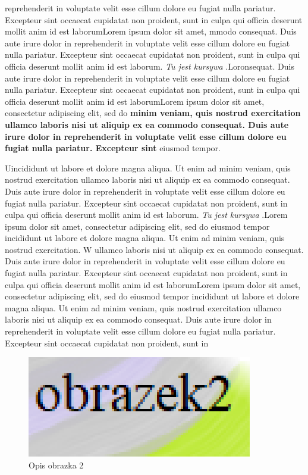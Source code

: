 \documentclass[12pt,a4paper,titlepage]{article}
\begin{document}
reprehenderit in voluptate velit esse cillum dolore eu fugiat nulla pariatur. Excepteur sint occaecat cupidatat non proident, sunt in culpa qui officia deserunt mollit anim id est laborumLorem ipsum dolor sit amet, mmodo consequat. Duis aute irure dolor in reprehenderit in voluptate velit esse cillum dolore eu fugiat nulla pariatur. Excepteur sint occaecat cupidatat non proident, sunt in culpa qui officia deserunt mollit anim id est laborum.  \textit{Tu jest kursywa} .Loronsequat. Duis aute irure dolor in reprehenderit in voluptate velit esse cillum dolore eu fugiat nulla pariatur. Excepteur sint occaecat cupidatat non proident, sunt in culpa qui officia deserunt mollit anim id est laborumLorem ipsum dolor sit amet, consectetur adipiscing elit, sed do \textbf{minim veniam, quis nostrud exercitation ullamco laboris nisi ut aliquip ex ea commodo consequat. Duis aute irure dolor in reprehenderit in voluptate velit esse cillum dolore eu fugiat nulla pariatur. Excepteur sint} eiusmod tempor. \par Uincididunt ut labore et dolore magna aliqua.  Ut enim ad minim veniam, quis nostrud exercitation ullamco laboris nisi ut aliquip ex ea commodo consequat. Duis aute irure dolor in reprehenderit in voluptate velit esse cillum dolore eu fugiat nulla pariatur. Excepteur sint occaecat cupidatat non proident, sunt in culpa qui officia deserunt mollit anim id est laborum.  \textit{Tu jest kursywa} .Lorem ipsum dolor sit amet, consectetur adipiscing elit, sed do eiusmod tempor incididunt ut labore et dolore magna aliqua. Ut enim ad minim veniam, quis nostrud exercitation. W \cite{autor1} ullamco laboris nisi ut aliquip ex ea commodo consequat. Duis aute irure dolor in reprehenderit in voluptate velit esse cillum dolore eu fugiat nulla pariatur. Excepteur sint occaecat cupidatat non proident, sunt in culpa qui officia deserunt mollit anim id est laborumLorem ipsum dolor sit amet, consectetur adipiscing elit, sed do eiusmod tempor incididunt ut labore et dolore magna aliqua.  Ut enim ad minim veniam, quis nostrud exercitation ullamco laboris nisi ut aliquip ex ea commodo consequat. Duis aute irure dolor in reprehenderit in voluptate velit esse cillum dolore eu fugiat nulla pariatur. Excepteur sint occaecat cupidatat non proident, sunt in 
\begin{figure}[h]
\centering
\includegraphics{obrazek2.png}
\caption{Opis obrazka 2}
\label{fig:obr2}
\end{figure}
\end{document}
